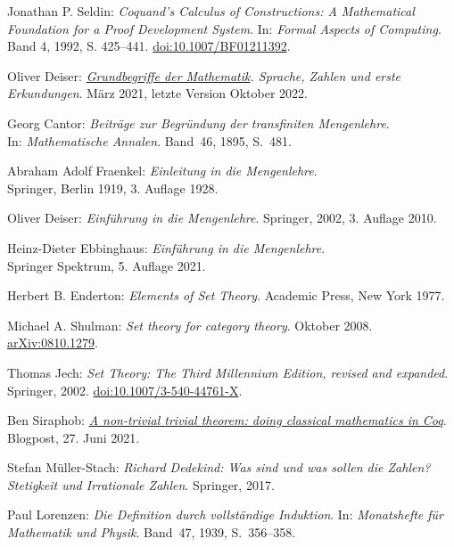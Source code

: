 \begin{thebibliography}{00}
 Jonathan P. Seldin:
\emph{Coquand's Calculus of Constructions: A Mathematical Foundation
for a Proof Development System}. In: \emph{Formal Aspects of Computing}.
Band 4, 1992, S. 425--441.
\href{https://doi.org/10.1007/BF01211392}{doi:10.1007/BF01211392}.

Oliver Deiser:
\emph{\href{https://www.aleph1.info/?call=Puc&permalink=grundbegriffe}%
{Grundbegriffe der Mathematik}. Sprache, Zahlen und erste
Erkundungen}. März 2021, letzte Version Oktober 2022.

 Georg Cantor:
\emph{Beiträge zur Begründung der transfiniten Mengenlehre}.\\
In: \emph{Mathematische Annalen}. Band~46, 1895, S.~481.

 Abraham Adolf Fraenkel:
\emph{Einleitung in die Mengenlehre}.\\
Springer, Berlin 1919, 3. Auflage 1928.

 Oliver Deiser:
\emph{Einführung in die Mengenlehre}.
Springer, 2002, 3. Auflage 2010.

 Heinz-Dieter Ebbinghaus:
\emph{Einführung in die Mengenlehre}.\\
Springer Spektrum, 5. Auflage 2021.

 Herbert B. Enderton:
\emph{Elements of Set Theory}. Academic Press, New York 1977.

 Michael A. Shulman:
\emph{Set theory for category theory}.
Oktober 2008.\\
\href{https://arxiv.org/abs/0810.1279}{arXiv:0810.1279}.

 Thomas Jech: \emph{Set Theory: The Third Millennium
Edition, revised and expanded}. Springer, 2002.
\href{https://doi.org/10.1007/3-540-44761-X}{doi:10.1007/3-540-44761-X}.

 Ben Siraphob:
\href{https://siraben.dev/2021/06/27/classical-math-coq.html}{%
\emph{A non-trivial trivial theorem: doing classical mathematics in Coq}}.
Blogpost, 27. Juni 2021.

 Stefan Müller-Stach:
\emph{Richard Dedekind: Was sind und was sollen die Zahlen?
Stetigkeit und Irrationale Zahlen}. Springer, 2017.

 Paul Lorenzen:
\emph{Die Definition durch vollständige Induktion}.
In: \emph{Monatshefte für Mathematik und Physik}.
Band~47, 1939, S.~356--358.


\end{thebibliography}
